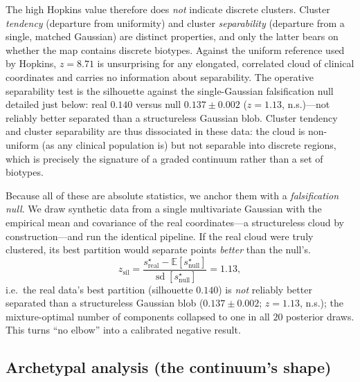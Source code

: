 The high Hopkins value therefore does \emph{not} indicate discrete clusters. Cluster
\emph{tendency} (departure from uniformity) and cluster \emph{separability} (departure
from a single, matched Gaussian) are distinct properties, and only the latter bears on
whether the map contains discrete biotypes. Against the uniform reference used by Hopkins,
$z=8.71$ is unsurprising for any elongated, correlated cloud of clinical coordinates and
carries no information about separability. The operative separability test is the
silhouette against the single-Gaussian falsification null detailed just below: real
$0.140$ versus null $0.137\pm0.002$ ($z=1.13$, n.s.)---not reliably better separated than a
structureless Gaussian blob. Cluster
tendency and cluster separability are thus dissociated in these data: the cloud is
non-uniform (as any clinical population is) but not separable into discrete regions, which
is precisely the signature of a graded continuum rather than a set of biotypes.

Because all of these are absolute statistics, we anchor them with a
\emph{falsification null}. We draw synthetic data from a single multivariate Gaussian
with the empirical mean and covariance of the real coordinates---a structureless cloud
by construction---and run the identical pipeline. If the real cloud were truly
clustered, its best partition would separate points \emph{better} than the null's.
\begin{equation}
  z_{\text{sil}}=\frac{s^{\star}_{\text{real}}-\mathbb E[s^{\star}_{\text{null}}]}{\operatorname{sd}[s^{\star}_{\text{null}}]}=1.13 ,
\end{equation}
i.e.\ the real data's best partition (silhouette $0.140$) is \emph{not} reliably better
separated than a structureless Gaussian blob ($0.137\pm0.002$; $z=1.13$, n.s.); the mixture-optimal number of components
collapsed to one in all $20$ posterior draws. This turns ``no elbow'' into a calibrated
negative result.

\subsection{Archetypal analysis (the continuum's shape)}

